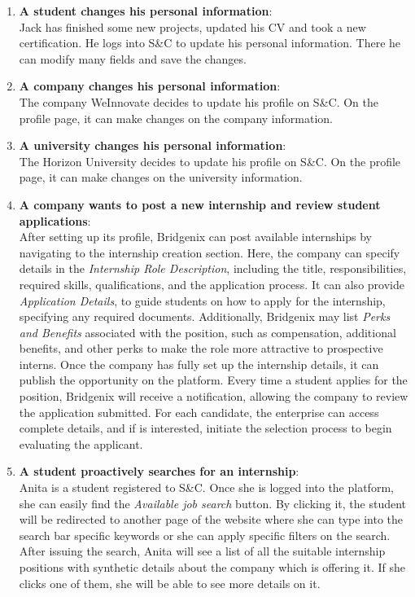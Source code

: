 \begin{enumerate}
            \item \textbf{A student changes his personal information}:
            \\ Jack has finished some new projects, updated his CV and took a new certification. He logs into S\&C to update his personal information. There he can modify many fields and save the changes. 
            
            \item \textbf{A company changes his personal information}:
            \\ The company WeInnovate decides to update his profile on S\&C. On the profile page, it can make changes on the company information.  

            \item \textbf{A university changes his personal information}:
            \\ The Horizon University decides to update his profile on S\&C. On the profile page, it can make changes on the university information.
            
            \newpage
            \item \textbf{A company wants to post a new internship and review student applications}:
            \\After setting up its profile, Bridgenix can post available internships by navigating to the internship creation section. Here, the company can specify details in the \textit{Internship Role Description}, including the title, responsibilities, required skills, qualifications, and the application process.
            It can also provide \textit{Application Details}, to guide students on how to apply for the internship, specifying any required documents. Additionally, Bridgenix may list \textit{Perks and Benefits} associated with the position, such as compensation, additional benefits, and other perks to make the role more attractive to prospective interns. Once the company has fully set up the internship details, it can publish the opportunity on the platform. 
            Every time a student applies for the position, Bridgenix will receive a notification, allowing the company to review the application submitted. For each candidate, the enterprise can access complete details, and if is interested, initiate the selection process to begin evaluating the applicant.
            
            \item \textbf{A student proactively searches for an internship}:  
            \\Anita is a student registered to S\&C. Once she is logged into the platform, she can easily find the \textit{Available job search} button. By clicking it, the student will be redirected to another page of the website where she can type into the search bar specific keywords or she can apply specific filters on the search. After issuing the search, Anita will see a list of all the suitable internship positions with synthetic details about the company which is offering it. If she clicks one of them, she will be able to see more details on it.
            

\end{enumerate}
